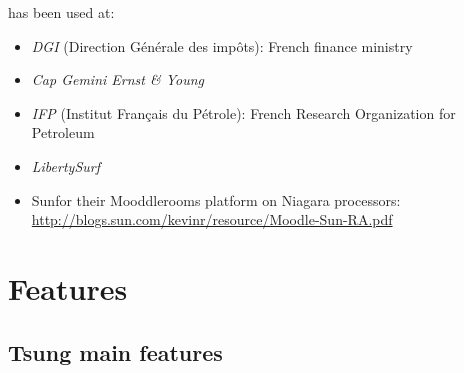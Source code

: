 \documentclass{TSUNG-en}
\begin{document}
 has been used  at:

\begin{itemize}
\item \emph{DGI} (Direction Générale des impôts): French finance ministry
\item \emph{Cap Gemini Ernst \& Young}
\item \emph{IFP} (Institut Français du Pétrole): French Research Organization
for Petroleum
\item \emph{LibertySurf}
\item Sun\texttrademark for their Mooddlerooms platform on Niagara processors:
 \url{http://blogs.sun.com/kevinr/resource/Moodle-Sun-RA.pdf}
\end{itemize}


\section{Features}

\subsection{Tsung main features}
\end{document}
